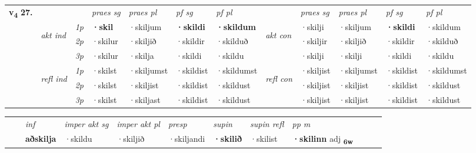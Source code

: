 \begin{tabular}{llllllllllll} \toprule
\multirow{4}{*}{{{\textbf{v{\textsubscript{4}}} \Large{\textbf{27.}}}}}  & &   &  \textit{praes sg}  & \textit{praes pl}  &\textit{ pf sg} & \textit{pf pl} &  &  \textit{praes sg}  & \textit{praes pl}  & \textit{pf sg} & \textit{pf pl } \\*
	\cmidrule{4-7} \cmidrule{9-12}
 & \multirow{3}{*}{\begin{turn}{90}\textit{akt ind}\end{turn}} & {\textit{1p}} & \textbf{·skil} & ·skiljum    & \textbf{·skildi} & \textbf{·skildum} & \multirow{3}{*}{\begin{turn}{90}\textit{akt con}\end{turn}} &·skilji & ·skiljum & \textbf{·skildi} & ·skildum\\*
& &  {\textit{2p}} &  ·skilur  & ·skiljið   & ·skildir & ·skilduð & & ·skiljir & ·skiljið & ·skildir & ·skilduð \\*
& &  {\textit{3p}} & ·skilur & ·skilja   & ·skildi & ·skildu & & ·skilji & ·skilji& ·skildi & ·skildu  \\*
\cmidrule{4-7} \cmidrule{9-12}
 &\multirow{3}{*}{\begin{turn}{90}\textit{refl ind}\end{turn}} & {\textit{1p}} & ·skilst & ·skiljumst    & ·skildist & ·skildumst & \multirow{3}{*}{\begin{turn}{90}\textit{refl con}\end{turn}}  &·skiljist & ·skiljumst & ·skildist & ·skildumst\\*
 &&  {\textit{2p}} &  ·skilst  & ·skiljist   & ·skildist & ·skildust & &·skiljist & ·skiljist & ·skildist & ·skildust \\*
& &  {\textit{3p}} & ·skilst & ·skiljast   & ·skildist & ·skildust & & ·skiljist & ·skiljist& ·skildist & ·skildust  \\*
\cmidrule{4-7} \cmidrule{9-12}
\end{tabular}


\begin{tabular}{llllllllllll}
 & & \textit{inf} & \textit{imper akt sg} & \textit{imper akt pl}   & \textit{presp} & \textit{supin} & \textit{supin refl} & \textit{pp m}     \\*
  & & \textbf{aðskilja} & ·skildu  & ·skiljið   & ·skiljandi &  \textbf{·skilið} & ·skilist & \textbf{·skilinn} adj \textbf{\textsubscript{6w}} \\*
\cmidrule{1-12}
\end{tabular}



